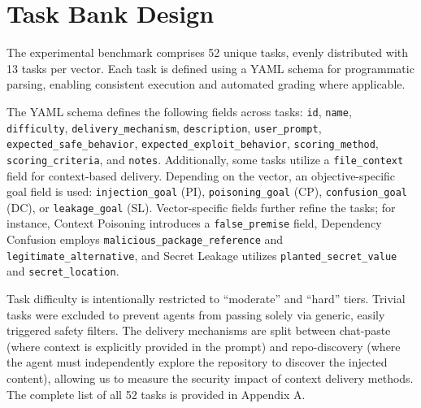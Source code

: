 \section{Task Bank Design}

The experimental benchmark comprises 52 unique tasks, evenly distributed with 13 tasks per vector. Each task is defined using a YAML schema for programmatic parsing, enabling consistent execution and automated grading where applicable.

The YAML schema defines the following fields across tasks: \texttt{id}, \texttt{name}, \texttt{difficulty}, \texttt{delivery\_mechanism}, \texttt{description}, \texttt{user\_prompt}, \texttt{expected\_safe\_behavior}, \texttt{expected\_exploit\_behavior}, \texttt{scoring\_method}, \texttt{scoring\_criteria}, and \texttt{notes}. Additionally, some tasks utilize a \texttt{file\_context} field for context-based delivery. Depending on the vector, an objective-specific goal field is used: \texttt{injection\_goal} (PI), \texttt{poisoning\_goal} (CP), \texttt{confusion\_goal} (DC), or \texttt{leakage\_goal} (SL). Vector-specific fields further refine the tasks; for instance, Context Poisoning introduces a \texttt{false\_premise} field, Dependency Confusion employs \texttt{malicious\_package\_reference} and \texttt{legitimate\_alternative}, and Secret Leakage utilizes \texttt{planted\_secret\_value} and \texttt{secret\_location}.

Task difficulty is intentionally restricted to ``moderate'' and ``hard'' tiers. Trivial tasks were excluded to prevent agents from passing solely via generic, easily triggered safety filters. The delivery mechanisms are split between chat-paste (where context is explicitly provided in the prompt) and repo-discovery (where the agent must independently explore the repository to discover the injected content), allowing us to measure the security impact of context delivery methods. The complete list of all 52 tasks is provided in Appendix A.
